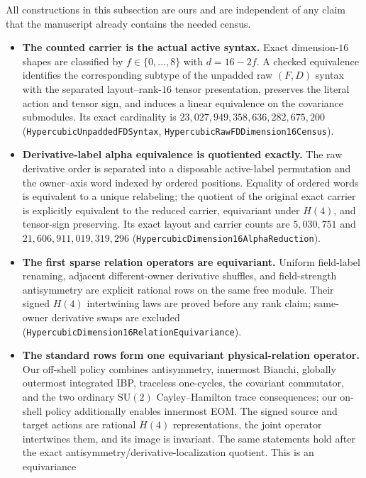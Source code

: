 \documentclass[11pt]{article}
\theoremstyle{definition}
\begin{document}
All constructions in this subsection are ours and are independent of any
claim that the manuscript already contains the needed census.

\begin{itemize}
  \item \textbf{The counted carrier is the actual active syntax.} Exact
    dimension-$16$ shapes are classified by $f\in\{0,\ldots,8\}$ with
    $d=16-2f$. A checked equivalence identifies the corresponding subtype of
    the unpadded raw $(F,D)$ syntax with the separated layout--rank-$16$
    tensor presentation, preserves the literal action and tensor sign, and
    induces a linear equivalence on the covariance submodules. Its exact
    cardinality is
    $23{,}027{,}949{,}358{,}636{,}282{,}675{,}200$
    (\texttt{HypercubicUnpaddedFDSyntax},
    \texttt{HypercubicRawFDDimension16Census}).
  \item \textbf{Derivative-label alpha equivalence is quotiented exactly.}
    The raw derivative order is separated into a disposable active-label
    permutation and the owner--axis word indexed by ordered positions.
    Equality of ordered words is equivalent to a unique relabeling; the
    quotient of the original exact carrier is explicitly equivalent to the
    reduced carrier, equivariant under $H(4)$, and tensor-sign preserving.
    Its exact layout and carrier counts are $5{,}030{,}751$ and
    $21{,}606{,}911{,}019{,}319{,}296$
    (\texttt{HypercubicDimension16AlphaReduction}).
  \item \textbf{The first sparse relation operators are equivariant.}
    Uniform field-label renaming, adjacent different-owner derivative
    shuffles, and
    field-strength antisymmetry are explicit rational rows on the same free
    module.  Their signed $H(4)$ intertwining laws are proved before any rank
    claim; same-owner derivative swaps are excluded
    (\texttt{HypercubicDimension16RelationEquivariance}).
  \item \textbf{The standard rows form one equivariant physical-relation
    operator.} Our off-shell policy combines antisymmetry, innermost Bianchi,
    globally outermost integrated IBP, traceless one-cycles, the covariant
    commutator, and the two ordinary $\mathrm{SU}(2)$ Cayley--Hamilton trace
    consequences; our on-shell policy additionally enables innermost EOM.
    The signed source and target actions are rational $H(4)$
    representations, the joint operator intertwines them, and its image is
    invariant.  The same statements hold after the exact
    antisymmetry/derivative-localization quotient.  This is an equivariance

\end{itemize}
\end{document}
